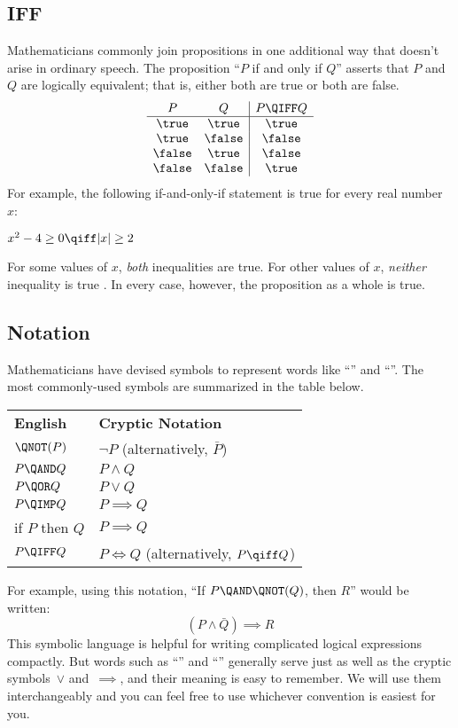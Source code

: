 \subsection{IFF}

Mathematicians commonly join propositions in one additional way that
doesn't arise in ordinary speech.  The proposition ``$P$ if and only
if $Q$'' asserts that $P$ and $Q$ are logically equivalent; that is,
either both are true or both are false.
%
\[
\begin{array}{cc|c}
P & Q & P \QIFF Q \\ \hline
\true & \true & \true \\
\true & \false & \false \\
\false & \true & \false \\
\false & \false & \true
\end{array}
\]
%
For example, the following if-and-only-if statement is true for every
real number $x$:
%
\begin{center}
$x^2 - 4 \geq 0 \qiff |x| \geq 2$
\end{center}
%
For some values of $x$, \textit{both} inequalities are true.  For
other values of $x$, \textit{neither} inequality is true .  In every
case, however, the proposition as a whole is true.

\subsection{Notation}

Mathematicians have devised symbols to represent words like ``\QAND''
and ``\QNOT''.  The most commonly-used symbols are summarized in the
table below.
%
\begin{center}
\begin{tabular}{ll}
\textbf{English} & \textbf{Cryptic Notation} \\[1ex]
$\QNOT(P)$ & $\neg P$ \quad (alternatively, $\bar{P}$) \\
$P \QAND Q$ & $P \land Q$ \\
$P \QOR Q$ & $P \lor Q$ \\
$P \QIMP Q$ & $P \implies Q$ \\
if $P$ then $Q$ & $P \implies Q$ \\
$P \QIFF Q$ & $P \iff Q$ \quad (alternatively, $P \qiff Q$)
\end{tabular}
\end{center}
%
For example, using this notation, ``If $P \QAND \QNOT(Q)$, then $R$''
would be written:
%
\[
    (P \land \bar{Q}) \implies R
\]
This symbolic language is helpful for writing complicated logical
expressions compactly.  But words such as ``\QOR'' and ``\QIMPLIES''
generally serve just as well as the cryptic symbols~$\lor$
and~$\implies$, and their meaning is easy to remember.  We will use
them interchangeably and you can feel free to use whichever convention
is easiest for you.

